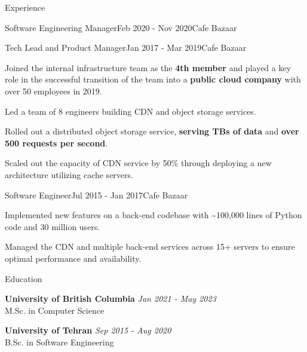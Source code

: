 \documentclass[
	10pt, %
]{resume} %
\begin{document}
\begin{rSection}{Experience}
\begin{rSubsection}{Software Engineering Manager}{Feb 2020 - Nov 2020}{Cafe Bazaar}{}
  \end{rSubsection}

  \begin{rSubsection}{Tech Lead and Product Manager}{Jan 2017 - Mar 2019}{Cafe Bazaar}{}

    \item Joined the internal infrastructure team as the \textbf{4th member} and played a
      key role in the successful transition of the team into a \textbf{public cloud
      company} with over 50 employees in 2019.

    \item Led a team of 8 engineers building CDN and object storage services.

    \item Rolled out a distributed object storage service, \textbf{serving
      TBs of data} and \textbf{over 500 requests per second}.

    \item Scaled out the capacity of CDN service by 50\% through deploying a new
      architecture utilizing cache servers.

  \end{rSubsection}

  \begin{rSubsection}{Software Engineer}{Jul 2015 - Jan 2017}{Cafe Bazaar}{}
    
    \item Implemented new features on a back-end codebase with \textasciitilde 100,000 lines
      of Python code and 30 million users.

    \item Managed the CDN and multiple back-end services across 15+ servers to
      ensure optimal performance and availability.

  \end{rSubsection}

\end{rSection}


\begin{rSection}{Education}
	
  \textbf{University of British Columbia} \hfill \textit{Jan 2021 - May 2023} \\ 
	M.Sc. in Computer Science

  \textbf{University of Tehran} \hfill \textit{Sep 2015 - Aug 2020} \\ 
	B.Sc. in Software Engineering
\end{rSection}
\end{document}
